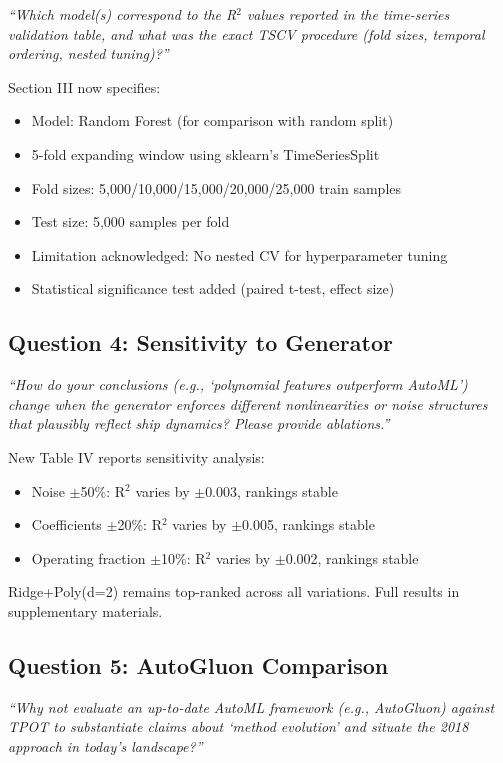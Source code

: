 \documentclass[11pt]{article}
\newcommand{\reviewer}[1]{\textcolor{reviewercolor}{\textit{#1}}}
\newcommand{\response}[1]{\textcolor{responsecolor}{#1}}
\begin{document}
\reviewer{``Which model(s) correspond to the R$^2$ values reported in the time-series validation table, and what was the exact TSCV procedure (fold sizes, temporal ordering, nested tuning)?''}

\response{Section III now specifies:
\begin{itemize}
    \item Model: Random Forest (for comparison with random split)
    \item 5-fold expanding window using sklearn's TimeSeriesSplit
    \item Fold sizes: 5,000/10,000/15,000/20,000/25,000 train samples
    \item Test size: 5,000 samples per fold
    \item Limitation acknowledged: No nested CV for hyperparameter tuning
    \item Statistical significance test added (paired t-test, effect size)
\end{itemize}
}

\subsection*{Question 4: Sensitivity to Generator}

\reviewer{``How do your conclusions (e.g., `polynomial features outperform AutoML') change when the generator enforces different nonlinearities or noise structures that plausibly reflect ship dynamics? Please provide ablations.''}

\response{New Table IV reports sensitivity analysis:
\begin{itemize}
    \item Noise $\pm$50\%: R$^2$ varies by $\pm$0.003, rankings stable
    \item Coefficients $\pm$20\%: R$^2$ varies by $\pm$0.005, rankings stable
    \item Operating fraction $\pm$10\%: R$^2$ varies by $\pm$0.002, rankings stable
\end{itemize}
Ridge+Poly(d=2) remains top-ranked across all variations. Full results in supplementary materials.
}

\subsection*{Question 5: AutoGluon Comparison}

\reviewer{``Why not evaluate an up-to-date AutoML framework (e.g., AutoGluon) against TPOT to substantiate claims about `method evolution' and situate the 2018 approach in today's landscape?''}
\end{document}

